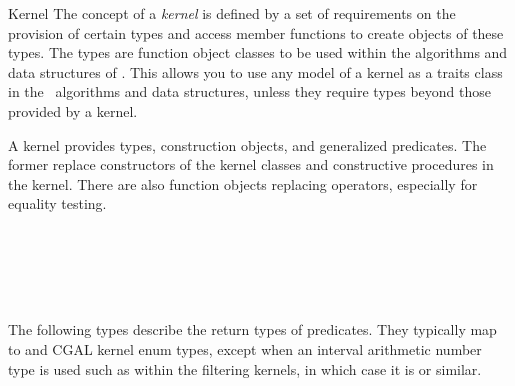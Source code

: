 \begin{ccRefConcept}{Kernel}
The concept of a {\em kernel} is defined by a set of requirements on
the provision of certain types and access member functions to create
objects of these types. The types are function object classes to be used
within the algorithms and data structures of \cgal.
This allows you to use any model of a kernel as a traits class in
the \cgal\ algorithms and data structures, unless they require types
beyond those provided by a kernel.


A kernel provides types, construction objects, and generalized predicates.
The former replace constructors of the kernel classes and constructive
procedures in the kernel. There are also function objects replacing operators,
especially for equality testing.

\ccHasModels

 \\
 \\
 \\
 \\


\ccTypes

\ccGlue
{}

The following types describe the return types of predicates.  They typically
map to  and CGAL kernel enum types, except when an interval arithmetic
number type is used such as within the filtering kernels, in which case it is
 or similar.

\ccGlue
{}
\ccGlue
{}
\ccGlue
{}
\ccGlue
{}
\ccGlue
{}
\ccGlue
{}



\end{ccRefConcept}
